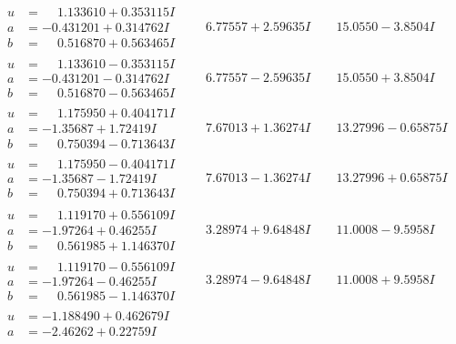 \documentclass[1p]{elsarticle_modified}
\theoremstyle{definition}
\begin{document}
$$\begin{array}{c|c|c}
\begin{aligned}
u &= \phantom{-}1.133610 + 0.353115 I \\
a &= -0.431201 + 0.314762 I \\
b &= \phantom{-}0.516870 + 0.563465 I\end{aligned}
 & \phantom{-}6.77557 + 2.59635 I & \phantom{-}15.0550 - 3.8504 I \\ \hline\begin{aligned}
u &= \phantom{-}1.133610 - 0.353115 I \\
a &= -0.431201 - 0.314762 I \\
b &= \phantom{-}0.516870 - 0.563465 I\end{aligned}
 & \phantom{-}6.77557 - 2.59635 I & \phantom{-}15.0550 + 3.8504 I \\ \hline\begin{aligned}
u &= \phantom{-}1.175950 + 0.404171 I \\
a &= -1.35687 + 1.72419 I \\
b &= \phantom{-}0.750394 - 0.713643 I\end{aligned}
 & \phantom{-}7.67013 + 1.36274 I & \phantom{-}13.27996 - 0.65875 I \\ \hline\begin{aligned}
u &= \phantom{-}1.175950 - 0.404171 I \\
a &= -1.35687 - 1.72419 I \\
b &= \phantom{-}0.750394 + 0.713643 I\end{aligned}
 & \phantom{-}7.67013 - 1.36274 I & \phantom{-}13.27996 + 0.65875 I \\ \hline\begin{aligned}
u &= \phantom{-}1.119170 + 0.556109 I \\
a &= -1.97264 + 0.46255 I \\
b &= \phantom{-}0.561985 + 1.146370 I\end{aligned}
 & \phantom{-}3.28974 + 9.64848 I & \phantom{-}11.0008 - 9.5958 I \\ \hline\begin{aligned}
u &= \phantom{-}1.119170 - 0.556109 I \\
a &= -1.97264 - 0.46255 I \\
b &= \phantom{-}0.561985 - 1.146370 I\end{aligned}
 & \phantom{-}3.28974 - 9.64848 I & \phantom{-}11.0008 + 9.5958 I \\ \hline\begin{aligned}
u &= -1.188490 + 0.462679 I \\
a &= -2.46262 + 0.22759 I \\

\end{aligned}
\end{array}$$
\end{document}
